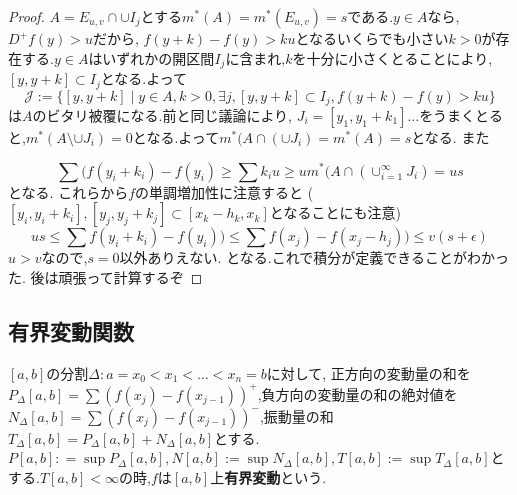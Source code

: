 \begin{proof}
$A = E_{u,v} \cap \cup I_j$とする$m^*(A) = m^*(E_{u,v}) =s$である.$y \in A$なら,$D^+f(y) > u$だから,
$f(y+k)  - f(y) > ku$となるいくらでも小さい$k > 0$が存在する.$y \in A$はいずれかの開区間$I_j$に含まれ,$k$を十分に小さくとることにより,
$[y, y+k] \subset I_j$となる.よって
\begin{equation*}
    \mathcal{J} := \{ [y, y+k] \mid y \in A, k> 0, \exists j, [y, y+k] \subset I_j, f(y+k) -f(y) > ku\}
\end{equation*}
は$A$のビタリ被覆になる.前と同じ議論により,
$J_i= [y_1, y_1 +k_1] ...$をうまくとると,$m^*(A \setminus \cup J_i) = 0$となる.よって$m^*(A \cap (\cup J_i) = m^*(A) = s$となる.
また

\begin{equation*}
\sum (f(y_i + k_i)  - f(y_i) \ge  \sum k_i u \ge um^*(A \cap (\cup_{i=1}^{\infty} J_i) = us
\end{equation*}
となる.
これらから$f$の単調増加性に注意すると
($[y_i, y_i+k_i], [y_j, y_j + k_j] \subset [x_k -h_k, x_k]$となることにも注意)
\begin{equation*}
us \le \sum f(y_i + k_i) - f(y_i) ) \le \sum f(x_j) - f(x_j - h_j))  \le v(s + \epsilon)
\end{equation*}
$u > v$なので,$s=0$以外ありえない.
となる.これで積分が定義できることがわかった.
後は頑張って計算するぞ
\end{proof}

\subsection{有界変動関数}
\begin{dfn}
 $[a,b]$の分割$\Delta: a=x_0 < x_1 < \ldots < x_n=b$に対して,
正方向の変動量の和を$P_{\Delta}[a, b] = \sum (f(x_j) - f(x_{j-1}))^+$,負方向の変動量の和の絶対値を$N_{\Delta}[a, b]= \sum (f(x_j) - f(x_{j-1}))^-$,振動量の和$T_{\Delta}[a,b] = P_{\Delta}[a,b] + N_{\Delta}[a, b]$とする.
$P[a,b]: = \sup P_{\Delta}[a, b], N[a,b] := \sup N_{\Delta}[a, b], T[a, b]:= \sup T_{\Delta}[a,b]$とする.$T[a, b] < \infty$の時,$f$は$[a, b]$上\textbf{有界変動}という.
\end{dfn}


